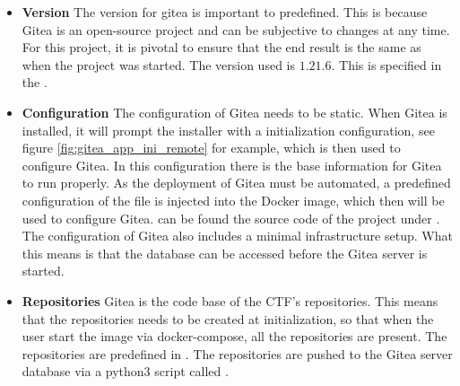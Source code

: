 \begin{itemize}
    \item \textbf{Version} The version for gitea is important to predefined. 
    This is because Gitea is an open-source project and can be subjective to changes at any time. For this project,
    it is pivotal to ensure that the end result is the same as when the project was started.
    The version used is $1.21.6$. This is specified in the .
    \item \textbf{Configuration} The configuration of Gitea needs to be static.
    When Gitea is installed,
    it will prompt the installer with a initialization configuration, see figure \ref{fig:gitea_app_ini_remote} for example,
    which is then used to configure Gitea. In this configuration there is the base information for Gitea to run properly.
    As the deployment of Gitea must be automated, a predefined configuration of the 
    file is injected into the Docker image, which then will be used to configure Gitea.
    can be found the source code of the project under .
    The configuration of Gitea also includes a minimal infrastructure setup. What this means is 
    that the database can be accessed before the Gitea server is started.

    \item \textbf{Repositories} Gitea is the code base of the CTF's repositories. 
    This means that the repositories needs to be created at initialization, so that when the user start the image via docker-compose,
    all the repositories are present.
    The repositories are predefined in .
    The repositories are pushed to the Gitea server database via a python3 script called \cite{cicd-goat}.
\end{itemize}
